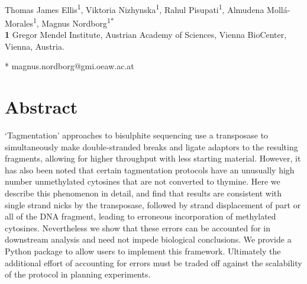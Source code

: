 \documentclass[10pt,draft,letterpaper]{article}
\begin{document}
\vspace*{0.2in}

\begin{flushleft}
{\Large
\textbf{} %
}
\newline
\\
Thomas James Ellis\textsuperscript{1},
Viktoria Nizhynska\textsuperscript{1},
Rahul Pisupati\textsuperscript{1},
Almudena Moll\'a-Morales\textsuperscript{1},
Magnus Nordborg\textsuperscript{1*}
\\
\bigskip
\textbf{1} Gregor Mendel Institute, Austrian Academy of Sciences, Vienna BioCenter, Vienna, Austria.
\\
\bigskip

* magnus.nordborg@gmi.oeaw.ac.at

\end{flushleft}
\section*{Abstract}
`Tagmentation' approaches to bisulphite sequencing use a transposase to simultaneously make double-stranded breaks and ligate adaptors to the resulting fragments, allowing for higher throughput with less starting material.
However, it has also been noted that certain tagmentation protocols have an unusually high number unmethylated cytosines that are not converted to thymine.
Here we describe this phenomenon in detail, and find that results are consistent with single strand nicks by the transposase, followed by strand displacement of part or all of the DNA fragment, leading to erroneous incorporation of methylated cytosines.
Nevertheless we show that these errors can be accounted for in downstream analysis and need not impede biological conclusions.
We provide a Python package to allow users to implement this framework.
Ultimately the additional effort of accounting for errors must be traded off against the scalability of the protocol in planning experiments.
\end{document}
